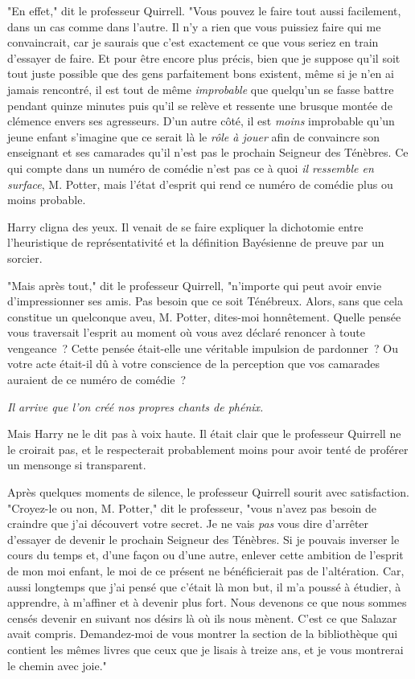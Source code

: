 "En effet," dit le professeur Quirrell. "Vous pouvez le faire tout aussi facilement, dans un cas comme dans l'autre. Il n'y a rien que vous puissiez faire qui me convaincrait, car je saurais que c'est exactement ce que vous seriez en train d'essayer de faire. Et pour être encore plus précis, bien que je suppose qu'il soit tout juste possible que des gens parfaitement bons existent, même si je n'en ai jamais rencontré, il est tout de même \emph{improbable} que quelqu'un se fasse battre pendant quinze minutes puis qu'il se relève et ressente une brusque montée de clémence envers ses agresseurs. D'un autre côté, il est \emph{moins} improbable qu'un jeune enfant s'imagine que ce serait là le \emph{rôle à jouer} afin de convaincre son enseignant et ses camarades qu'il n'est pas le prochain Seigneur des Ténèbres. Ce qui compte dans un numéro de comédie n'est pas ce à quoi \emph{il ressemble en surface}, M. Potter, mais l'état d'esprit qui rend ce numéro de comédie plus ou moins probable.

Harry cligna des yeux. Il venait de se faire expliquer la dichotomie entre l'heuristique de représentativité et la définition Bayésienne de preuve par un sorcier.

"Mais après tout," dit le professeur Quirrell, "n'importe qui peut avoir envie d'impressionner ses amis. Pas besoin que ce soit Ténébreux. Alors, sans que cela constitue un quelconque aveu, M. Potter, dites-moi honnêtement. Quelle pensée vous traversait l'esprit au moment où vous avez déclaré renoncer à toute vengeance~? Cette pensée était-elle une véritable impulsion de pardonner~? Ou votre acte était-il dû à votre conscience de la perception que vos camarades auraient de ce numéro de comédie~?

\emph{Il arrive que l'on créé nos propres chants de phénix.}

Mais Harry ne le dit pas à voix haute. Il était clair que le professeur Quirrell ne le croirait pas, et le respecterait probablement moins pour avoir tenté de proférer un mensonge si transparent.

Après quelques moments de silence, le professeur Quirrell sourit avec satisfaction. "Croyez-le ou non, M. Potter," dit le professeur, "vous n'avez pas besoin de craindre que j'ai découvert votre secret. Je ne vais \emph{pas} vous dire d'arrêter d'essayer de devenir le prochain Seigneur des Ténèbres. Si je pouvais inverser le cours du temps et, d'une façon ou d'une autre, enlever cette ambition de l'esprit de mon moi enfant, le moi de ce présent ne bénéficierait pas de l'altération. Car, aussi longtemps que j'ai pensé que c'était là mon but, il m'a poussé à étudier, à apprendre, à m'affiner et à devenir plus fort. Nous devenons ce que nous sommes censés devenir en suivant nos désirs là où ils nous mènent. C'est ce que Salazar avait compris. Demandez-moi de vous montrer la section de la bibliothèque qui contient les mêmes livres que ceux que je lisais à treize ans, et je vous montrerai le chemin avec joie."

